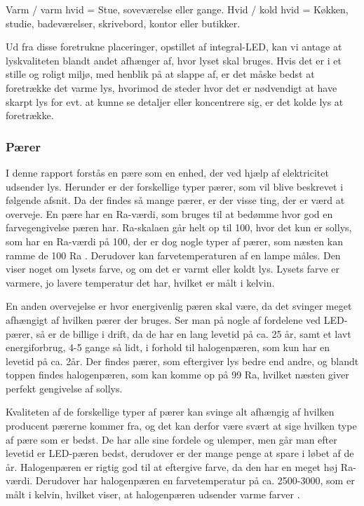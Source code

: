 Varm / varm hvid = Stue, soveværelse eller gange.
Hvid / kold hvid = Køkken, studie, badeværelser, skrivebord, kontor eller butikker\cite{varm_kold}.

Ud fra disse foretrukne placeringer, opstillet af integral-LED, kan vi antage at lyskvaliteten blandt andet afhænger af, hvor lyset skal bruges. Hvis det er i et stille og roligt miljø, med henblik på at slappe af, er det måske bedst at foretrække det varme lys, hvorimod de steder hvor det er nødvendigt at have skarpt lys for evt. at kunne se detaljer eller koncentrere sig, er det kolde lys at foretrække.

\subsubsection{Pærer}
I denne rapport forstås en pære som en enhed, der ved hjælp af elektricitet udsender lys. Herunder er der forskellige typer pærer, som vil blive beskrevet i følgende afsnit.
Da der findes så mange pærer, er der visse ting, der er værd at overveje. En pære har en Ra-værdi, som bruges til at bedømme hvor god en farvegengivelse pæren har. Ra-skalaen går helt op til 100, hvor det kun er sollys, som har en Ra-værdi på 100, der er dog nogle typer af pærer, som næsten kan ramme de 100 Ra \cite{halogen_paere}. Derudover kan farvetemperaturen af en lampe måles. Den viser noget om lysets farve, og om det er varmt eller koldt lys. Lysets farve er varmere, jo lavere temperatur det har, hvilket er målt i kelvin\cite{farvetemperatur}.

En anden overvejelse er hvor energivenlig pæren skal være, da det svinger meget afhængigt af hvilken pærer der bruges. Ser man på nogle af fordelene ved LED-pærer, så er de billige i drift, da de har en lang levetid på ca. 25 år, samt et lavt energiforbrug\cite{LED}, 4-5 gange så lidt, i forhold til halogenpæren, som kun har en levetid på ca. 2år\cite{vaelg_paere}. 
Der findes pærer, som eftergiver lys bedre end andre, og blandt toppen findes halogenpæren, som kan komme op på 99 Ra, hvilket næsten giver perfekt gengivelse af sollys\cite{halogen_paere}. 

Kvaliteten af de forskellige typer af pærer kan svinge alt afhængig af hvilken producent pærerne kommer fra, og det kan derfor være svært at sige hvilken type af pære som er bedst. De har alle sine fordele og ulemper, men går man efter levetid er LED-pæren bedst, derudover er der mange penge at spare i løbet af de år. Halogenpæren er rigtig god til at eftergive farve, da den har en meget høj Ra-værdi. Derudover har halogenpæren en farvetemperatur på ca. 2500-3000, som er målt i kelvin, hvilket viser, at halogenpæren udsender varme farver \cite{farvetemperatur}. 

